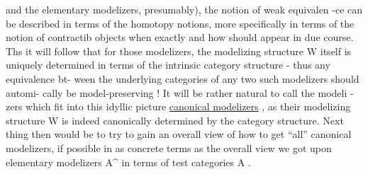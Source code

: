 and the elementary modelizers,  presumably),  the notion of weak equivalen
-ce  can be described in terms of the homotopy notions,  more specifically
in terms of the notion of contractib  objects  \hand{(} when exactly
and how should appear in due course\hand{)}. Ths it will follow that for those
modelizers,  the modelizing structure W itself is uniquely determined in
terms of the intrinsic category structure  -  thus any equivalence bt-%
ween the underlying categories of any two such modelizers should automi-%
cally be model-preserving !  It will be rather natural to call  the modeli
-zers which fit into this idyllic picture \uline{canonical modelizers} ,  as their
modelizing structure W is indeed canonically determined by the category
structure.  Next thing then would be to try to gain an overall view of
how to get ``all''  canonical modelizers,  if possible in as concrete terms
as the overall view we got upon elementary modelizers A\^{} in terms of  test
categories A .

